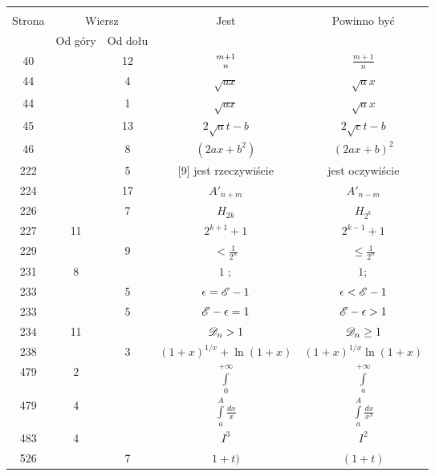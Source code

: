 \documentclass[a4paper,11pt]{article}
\begin{document}
\begin{center}
  \begin{tabular}{|c|c|c|c|c|}
    \hline
    & \multicolumn{2}{c|}{} & & \\
    Strona & \multicolumn{2}{c|}{Wiersz} & Jest
                              & Powinno być \\ \cline{2-3}
    & Od góry & Od dołu & & \\
    \hline
    40  & & 12 & ${ m + 1 \atop n }$ & $\frac{ m + 1 }{ n }$ \\
    44  & &  4 & $\sqrt{ a x }$ & $\sqrt{ a } x$ \\
    44  & &  1 & $\sqrt{ a x }$ & $\sqrt{ a } x$ \\
    45  & & 13 & $2 \sqrt{ a } t - b$ & $2 \sqrt{ c } t - b$ \\
    46  & &  8 & $( 2 a x + b^{ 2 } )$ & $( 2 a x + b )^{ 2 }$ \\
    222 & &  5 & [9] jest rzeczywiście & jest oczywiście \\
    224 & & 17 & $A'_{ n + m }$ & $A'_{ n - m }$ \\
    226 & &  7 & $H_{ 2k }$ & $H_{ 2^{ k } }$ \\
    227 & 11 & & $2^{ k + 1 } + 1$ & $2^{ k - 1 } + 1$ \\
    229 & &  9 & $< \frac{ 1 }{ 2^{ n } }$ & $\leq \frac{ 1 }{ 2^{ n } }$ \\
    231 &  8 & & $1\; ;$ & $1;$ \\
    233 & &  5 & $\epsilon = \mathcal{E} - 1$ & $\epsilon < \mathcal{E} - 1$ \\
    233 & &  5 & $\mathcal{E} - \epsilon = 1$ & $\mathcal{E} - \epsilon > 1$ \\
    234 & 11 & & $\mathcal{D}_{ n } > 1$ & $\mathcal{D}_{ n } \geq 1$ \\
    238 & &  3 & $( 1 + x )^{ 1 / x } + \ln( 1 + x )$
           & $( 1 + x )^{ 1 / x } \ln( 1 + x )$ \\
           479 &  2 & & $\int\limits_{ 0 }^{ +\infty }$
           & $\int\limits_{ a }^{ +\infty }$ \\[0.8em]
           479 &  4 & & $\int\limits_{ a }^{ A } \frac{ dx }{ x }$
           & $\int\limits_{ a }^{ A } \frac{ dx }{ x^{ \lambda } }$ \\[0.5em]
           483 &  4 & & $I^{ 3 }$ & $I^{ 2 }$ \\
           526 & &  7 & $1 + t)$ & $( 1 + t )$ \\
    \hline
  \end{tabular}

\end{center}
\end{document}
